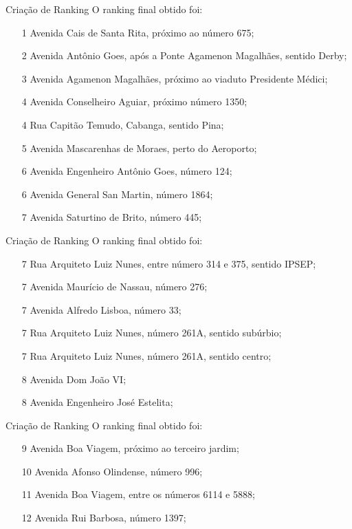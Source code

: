 \begin{frame}{Criação de Ranking}
O ranking final obtido foi:
\begin{enumerate}
	\item[1] Avenida Cais de Santa Rita, próximo ao número 675;
	\item[2] Avenida Antônio Goes, após a Ponte Agamenon Magalhães, sentido Derby;
	\item[3] Avenida Agamenon Magalhães, próximo ao viaduto Presidente Médici;
	\item[4] Avenida Conselheiro Aguiar, próximo número 1350;
	\item[4] Rua Capitão Temudo, Cabanga, sentido Pina;
	\item[5] Avenida Mascarenhas de Moraes, perto do Aeroporto;
	\item[6] Avenida Engenheiro Antônio Goes, número 124;
	\item[6] Avenida General San Martin, número 1864;
	\item[7] Avenida Saturtino de Brito, número 445;
\end{enumerate}
\end{frame}

\begin{frame}{Criação de Ranking}
O ranking final obtido foi:
\begin{enumerate}
	\item[7] Rua Arquiteto Luiz Nunes, entre número 314 e 375, sentido IPSEP;
	\item[7] Avenida Maurício de Nassau, número 276;
	\item[7] Avenida Alfredo Lisboa, número 33;
	\item[7] Rua Arquiteto Luiz Nunes, número 261A, sentido subúrbio;
	\item[7] Rua Arquiteto Luiz Nunes, número 261A, sentido centro;
	\item[8] Avenida Dom João VI;
	\item[8] Avenida Engenheiro José Estelita;
\end{enumerate}
\end{frame}

\begin{frame}{Criação de Ranking}
O ranking final obtido foi:
\begin{enumerate}
	\item[9] Avenida Boa Viagem, próximo ao terceiro jardim;
	\item[10] Avenida Afonso Olindense, número 996;
	\item[11] Avenida Boa Viagem, entre os números 6114 e 5888;
	\item[12] Avenida Rui Barbosa, número 1397;
\end{enumerate}
\end{frame}
